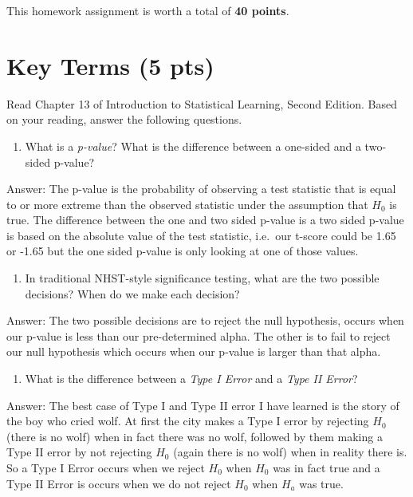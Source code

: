 \documentclass[
]{article}
\providecommand{\tightlist}{%
  \setlength{\itemsep}{0pt}\setlength{\parskip}{0pt}}
\begin{document}
This homework assignment is worth a total of \textbf{40 points}.

\hypertarget{key-terms-5-pts}{%
\section{Key Terms (5 pts)}\label{key-terms-5-pts}}

Read Chapter 13 of Introduction to Statistical Learning, Second Edition.
Based on your reading, answer the following questions.

\begin{enumerate}
\def\labelenumi{\arabic{enumi}.}
\tightlist
\item
  What is a \emph{p-value}? What is the difference between a one-sided
  and a two-sided p-value?
\end{enumerate}

Answer: The p-value is the probability of observing a test statistic
that is equal to or more extreme than the observed statistic under the
assumption that \(H_0\) is true. The difference between the one and two
sided p-value is a two sided p-value is based on the absolute value of
the test statistic, i.e.~our t-score could be 1.65 or -1.65 but the one
sided p-value is only looking at one of those values.

\begin{enumerate}
\def\labelenumi{\arabic{enumi}.}
\setcounter{enumi}{1}
\tightlist
\item
  In traditional NHST-style significance testing, what are the two
  possible decisions? When do we make each decision?
\end{enumerate}

Answer: The two possible decisions are to reject the null hypothesis,
occurs when our p-value is less than our pre-determined alpha. The other
is to fail to reject our null hypothesis which occurs when our p-value
is larger than that alpha.

\begin{enumerate}
\def\labelenumi{\arabic{enumi}.}
\setcounter{enumi}{2}
\tightlist
\item
  What is the difference between a \emph{Type I Error} and a \emph{Type
  II Error}?
\end{enumerate}

Answer: The best case of Type I and Type II error I have learned is the
story of the boy who cried wolf. At first the city makes a Type I error
by rejecting \(H_0\) (there is no wolf) when in fact there was no wolf,
followed by them making a Type II error by not rejecting \(H_0\) (again
there is no wolf) when in reality there is. So a Type I Error occurs
when we reject \(H_0\) when \(H_0\) was in fact true and a Type II Error
is occurs when we do not reject \(H_0\) when \(H_a\) was true.
\end{document}
